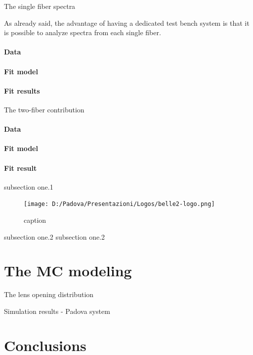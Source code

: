 \documentclass[a4paper,11pt]{article}
\begin{document}
\begin{subsection}{The  single fiber spectra}

As already said, the advantage of having a dedicated test bench system is that it is possible to analyze spectra from each single fiber. 

\paragraph{Data} 

\paragraph{Fit model}


\paragraph{Fit results}

\end{subsection}

\begin{subsection}{The two-fiber contribution}
\paragraph{Data}
\paragraph{Fit model}
\paragraph{Fit result}



\end{subsection}

\begin{subsection}{subsection one.1}
\begin{figure}[h]\label{fig:1d_case}
\texttt{[image: D:/Padova/Presentazioni/Logos/belle2-logo.png]}
\caption{\footnotesize caption}
\end{figure}
\end{subsection}


\begin{subsection}{subsection one.2}
 subsection one.2
\end{subsection}



\section{The MC modeling}
\begin{subsection}{The lens opening distribution}

\end{subsection}
\begin{subsection}{Simulation results - Padova system}

\end{subsection}
\section{Conclusions}
\end{document}

